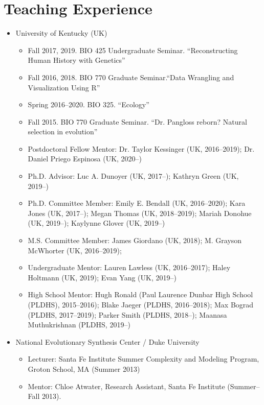 \documentclass[11pt]{article}
\begin{document}
  \section{Teaching Experience}

  \begin{itemize}
  \item University of Kentucky (UK)
    \begin{itemize}
    \item Fall 2017, 2019. BIO 425 Undergraduate Seminar. ``Reconstructing Human History with Genetics''
    \item Fall 2016, 2018. BIO 770 Graduate Seminar.``Data Wrangling and Visualization Using R''
    \item Spring 2016--2020. BIO 325. ``Ecology''
    \item Fall 2015. BIO 770 Graduate Seminar. ``Dr. Pangloss reborn? Natural selection in evolution''
    \item Postdoctoral Fellow Mentor: Dr. Taylor Kessinger (UK, 2016--2019); Dr. Daniel Priego Espinosa (UK, 2020--)
    \item Ph.D. Advisor: Luc A. Dunoyer (UK, 2017--); Kathryn Green (UK, 2019--)
    \item Ph.D. Committee Member: Emily E. Bendall (UK, 2016--2020); Kara Jones (UK, 2017--); Megan Thomas (UK, 2018--2019); Mariah Donohue (UK, 2019--); Kaylynne Glover (UK, 2019--)
     \item M.S. Committee Member: James Giordano (UK, 2018); M. Grayson McWhorter (UK, 2016--2019); 
    \item Undergraduate Mentor: Lauren Lawless (UK, 2016--2017); Haley Holtmann (UK, 2019); Evan Yang (UK, 2019--)
    \item High School Mentor: Hugh Ronald (Paul Laurence Dunbar High School (PLDHS), 2015--2016); Blake Jaeger (PLDHS, 2016--2018); Max Bograd (PLDHS, 2017--2019); Parker Smith (PLDHS, 2018--); Maanasa Muthukrishnan (PLDHS, 2019--)
    \end{itemize}
  \item National Evolutionary Synthesis Center / Duke University
    \begin{itemize}
    \item Lecturer: Santa Fe Institute Summer Complexity and Modeling Program, \\
      Groton School, MA (Summer 2013)
    \item Mentor: Chloe Atwater, Research Assistant, Santa Fe Institute (Summer--Fall 2013).
    \end{itemize}

\end{itemize}
\end{document}
